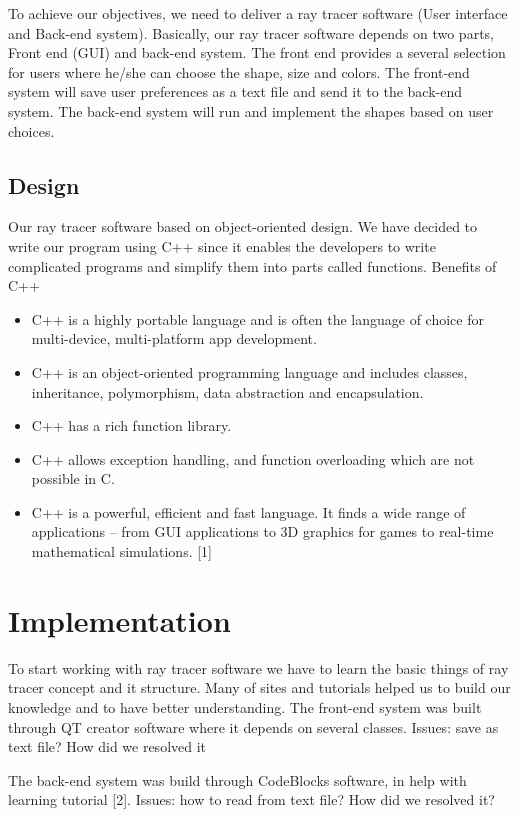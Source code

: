 \documentclass{article}
\begin{document}
To achieve our objectives, we need to deliver a ray tracer software (User interface and Back-end system). 
Basically, our ray tracer software depends on two parts, Front end (GUI) and back-end system. The front end provides a several selection for users where he/she can choose the shape, size and colors. The front-end system will save user preferences as a text file and send it to the back-end system. 
The back-end system will run and implement the shapes based on user choices.



\subsection{Design}

Our ray tracer software based on object-oriented design. We have decided to write our program using C++ since it enables the developers to write complicated programs and simplify them into parts called functions. 
Benefits of C++
\begin{itemize}
    \item 
	C++ is a highly portable language and is often the language of choice for multi-device, multi-platform app development.
\item	C++ is an object-oriented programming language and includes classes, inheritance, polymorphism, data abstraction and encapsulation.
\item	C++ has a rich function library.
\item	C++ allows exception handling, and function overloading which are not possible in C.
\item	C++ is a powerful, efficient and fast language. It finds a wide range of applications – from GUI applications to 3D graphics for games to real-time mathematical simulations. [1]

\end{itemize}

\section{Implementation}
To start working with ray tracer software we have to learn the basic things of ray tracer concept and it structure. Many of sites and tutorials helped us to build our knowledge and to have better understanding. 
The front-end system was built through QT creator software where it depends on several classes.
Issues: save as text file? How did we resolved it

The back-end system was build through CodeBlocks software, in help with learning tutorial [2].
Issues: how to read from text file? How did we resolved it?
\end{document}
